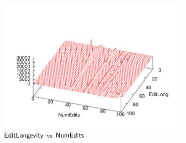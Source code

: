 \begin{figure}[tbph]
    \begin{center}
    \includegraphics[width=0.85\textwidth]{part-I10-contrib/graphs/prct-editlong-numedits}
    \end{center}
    \caption[Comparing edit longevity with the number of edits made]{
    	$\editlong$ vs $\numedits$
    }
    \label{fig-prct-editlong-numedits}
\end{figure}

